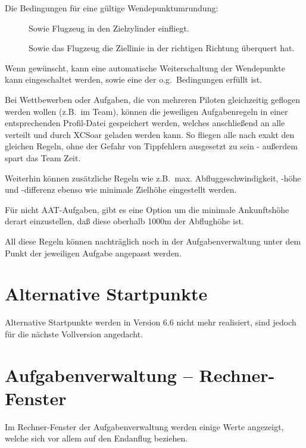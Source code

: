 Die Bedingungen für eine gültige Wendepunktumrundung: 
\begin{description}
\item[] Sowie Flugzeug in den Zielzylinder einfliegt.
\item[] Sowie das Flugzeug die Ziellinie in der richtigen Richtung überquert hat.
\end{description}

Wenn gewünscht, kann eine automatische Weiterschaltung der Wendepunkte kann eingeschaltet werden, sowie eine der o.g.\ Bedingungen erfüllt ist.

\tip Bei Wettbewerben oder Aufgaben, die von mehreren Piloten gleichzeitig geflogen werden wollen (z.B.\ im Team), können die  jeweiligen Aufgabenregeln  in einer entsprechenden Profil-Datei  gespeichert werden, welches anschließend an alle verteilt und durch \textsf{XCSoar} geladen werden kann. So fliegen alle nach exakt den gleichen Regeln, ohne der Gefahr von Tippfehlern ausge\-setzt zu sein - außerdem spart das Team Zeit.

Weiterhin können zusätzliche Regeln wie z.B.\ max. Abfluggeschwindigkeit, -höhe und -differenz ebenso wie minimale Zielhöhe eingestellt werden.

Für nicht AAT-Aufgaben, gibt es eine Option um die minimale Ankunftshöhe derart einzustellen, daß diese oberhalb 1000m der Abflughöhe ist.

All diese Regeln  können    nachträglich noch in der  Aufgabenverwaltung  unter dem Punkt    der jeweiligen Aufgabe angepasst werden.
 



\section{Alternative Startpunkte}\label{sec:alternate-starts}

Alternative Startpunkte werden in Version 6.6 nicht mehr realisiert, sind jedoch für die nächste Vollversion angedacht.

\section{Aufgabenverwaltung -- Rechner-Fenster} \label{sec:task-calc-dial}
Im Rechner-Fenster  der Aufgabenverwaltung werden einige Werte angezeigt, welche sich vor allem auf den Endanflug beziehen.

